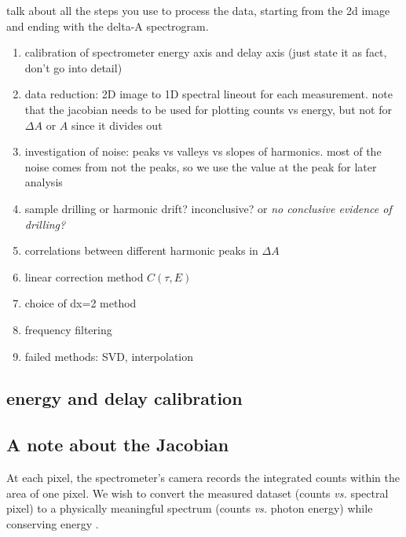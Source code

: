 talk about all the steps you use to process the data, starting from the 2d image and ending with the delta-A spectrogram.

\begin{enumerate}
	\item calibration of spectrometer energy axis and delay axis (just state it as fact, don't go into detail)
	\item data reduction: 2D image to 1D spectral lineout for each measurement. note that the jacobian needs to be used for plotting counts vs energy, but not for $\Delta A$ or $A$ since it divides out
	\item investigation of noise: peaks vs valleys vs slopes of harmonics. most of the noise comes from not the peaks, so we use the value at the peak for later analysis
	\item sample drilling or harmonic drift? inconclusive? or \textit{no conclusive evidence of drilling?}
	\item correlations between different harmonic peaks in $\Delta A$
	\item linear correction method $C(\tau,E)$
	\item choice of dx=2 method
	\item frequency filtering
	\item failed methods: SVD, interpolation
\end{enumerate}

\subsection{energy and delay calibration}
\subsection{A note about the Jacobian}

At each pixel, the spectrometer's camera records the integrated counts within the area of one pixel. We wish to convert the measured dataset (counts \textit{vs.} spectral pixel) to a physically meaningful spectrum (counts \textit{vs.} photon energy) while conserving energy \cite{mooneyGetBasicsRight2013}.

